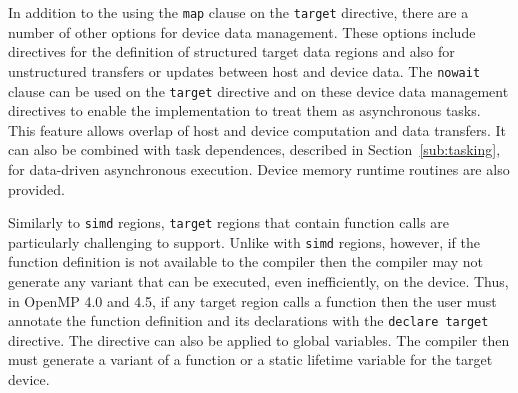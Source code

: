 In addition to the using the \texttt{map} clause on the \texttt{target}
directive, there are a number of other options for device data management. 
These options include directives for the definition of structured target data 
regions and also for unstructured transfers or updates between host and 
device data. The \texttt{nowait} clause can be used on the \texttt{target}
directive and on these device data management directives to enable the 
implementation to treat them as asynchronous tasks.  This feature allows 
overlap of host and device computation and data transfers.  It can also be 
combined with task dependences, described in Section~\ref{sub:tasking},  
for data-driven asynchronous execution. Device memory runtime routines are 
also provided.

Similarly to \texttt{simd} regions, \texttt{target} regions that contain 
function calls are particularly challenging to support.  Unlike with 
\texttt{simd} regions, however, if the function definition is not 
available to the compiler then the compiler may not generate any variant
that can be executed, even inefficiently, on the device. Thus, in OpenMP 4.0
and 4.5, if any target region calls a function then the user must annotate  
the function definition and its declarations with the \texttt{declare target} 
directive. The directive can also be applied to global variables. The compiler
then must generate a variant of a function or a static lifetime variable for 
the target device. 

